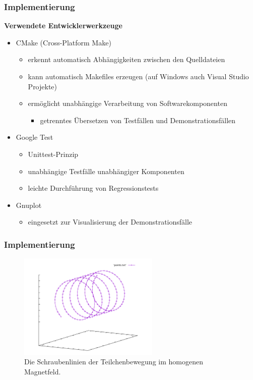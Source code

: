 \begin{frame}
  \frametitle{Implementierung}
  \textbf{Verwendete Entwicklerwerkzeuge}
  \begin{itemize}
    \item CMake (Cross-Platform Make)
      \begin{itemize}
        \item erkennt automatisch Abh\"angigkeiten zwischen den Quelldateien
        \item kann automatisch Makefiles erzeugen (auf Windows auch Visual Studio Projekte)
        \item erm\"oglicht unabh\"angige Verarbeitung von Softwarekomponenten
          \begin{itemize}
            \item getrenntes \"Ubersetzen von Testf\"allen und Demonstrationsf\"allen
          \end{itemize}
      \end{itemize}
    \item Google Test
      \begin{itemize}
        \item Unittest-Prinzip
        \item unabh\"angige Testf\"alle unabh\"angiger Komponenten
        \item leichte Durchf\"uhrung von Regressionstests
      \end{itemize}
    \item Gnuplot
      \begin{itemize}
        \item eingesetzt zur Visualisierung der Demonstrationsf\"alle
      \end{itemize}
  \end{itemize}
\end{frame}

\begin{frame}
  \frametitle{Implementierung}
  \begin{figure}
    \centering
    \includegraphics[width=0.6\textwidth]{../gnuplot/homogeneous}
    \caption{Die Schraubenlinien der Teilchenbewegung im homogenen Magnetfeld.}
    \label{fig:homogeneous_plot}
  \end{figure}
\end{frame}

